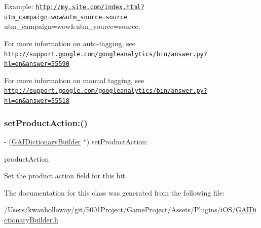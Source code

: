 Example\+: \href{http://my.site.com/index.html?utm_campaign=wow&utm_source=source}{\tt http\+://my.\+site.\+com/index.\+html?utm\+\_\+campaign=wow\&utm\+\_\+source=source} utm\+\_\+campaign=wow\&utm\+\_\+source=source. 

For more information on auto-\/tagging, see \href{http://support.google.com/googleanalytics/bin/answer.py?hl=en&answer=55590}{\tt http\+://support.\+google.\+com/googleanalytics/bin/answer.\+py?hl=en\&answer=55590} 

For more information on manual tagging, see \href{http://support.google.com/googleanalytics/bin/answer.py?hl=en&answer=55518}{\tt http\+://support.\+google.\+com/googleanalytics/bin/answer.\+py?hl=en\&answer=55518} \mbox{\label{interface_g_a_i_dictionary_builder_a11fcf09c3322830c93560ca11c1b0979}} 
\subsubsection{\texorpdfstring{set\+Product\+Action\+:()}{setProductAction:()}}
{\footnotesize\ttfamily -\/ (\hyperlink{interface_g_a_i_dictionary_builder}{G\+A\+I\+Dictionary\+Builder} $\ast$) set\+Product\+Action\+: \begin{DoxyParamCaption}\item[{(\hyperlink{interface_g_a_i_ecommerce_product_action}{G\+A\+I\+Ecommerce\+Product\+Action} $\ast$)}]{product\+Action }\end{DoxyParamCaption}}

Set the product action field for this hit. 

The documentation for this class was generated from the following file\+:\begin{DoxyCompactItemize}
\item 
/\+Users/kwanholloway/git/5001\+Project/\+Game\+Project/\+Assets/\+Plugins/i\+O\+S/\hyperlink{_g_a_i_dictionary_builder_8h}{G\+A\+I\+Dictionary\+Builder.\+h}\end{DoxyCompactItemize}
